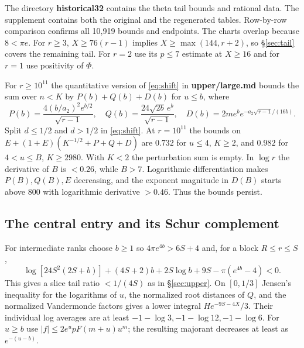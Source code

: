 \documentclass[11pt,a4paper,reqno]{amsart}
\numberwithin{equation}{section}
\begin{document}
The directory \textbf{historical32} contains the theta tail bounds and rational data. The supplement contains both the original and the regenerated tables. Row-by-row comparison confirms all 10,919 bounds and endpoints. The charts overlap because \(8<\pi e\). For \(r\ge3\), \(X\ge76(r-1)\) implies \(X\ge\max(144,r+2)\), so \S\ref{sec:tail} covers the remaining tail. For \(r=2\) use its \(p\le7\) estimate at \(X\ge16\) and for \(r=1\) use positivity of \(\Phi\).

For \(r\ge10^{11}\) the quantitative version of \eqref{eq:shift} in \textbf{upper/large.md} bounds the sum over \(n<K\) by \(P(b)+Q(b)+D(b)\) for \(u\le b\), where \[P(b)=\frac{4(b/a_2)^2e^{b/2}}{\sqrt{r-1}},\quad Q(b)=\frac{24\sqrt{2b}\,e^b}{\sqrt{r-1}},\quad
D(b)=2m e^b e^{-a_2\sqrt{r-1}/(16b)}.\] Split \(d\le1/2\) and \(d>1/2\) in \eqref{eq:shift}. At \(r=10^{11}\) the bounds on \(E+(1+E)(K^{-1/2}+P+Q+D)\) are \(0.732\) for \(u\le4\), \(K\ge2\), and \(0.982\) for \(4<u\le B\), \(K\ge2980\). With \(K<2\) the perturbation sum is empty. In \(\log r\) the derivative of \(B\) is \(<0.26\), while \(B>7\). Logarithmic differentiation makes \(P(B),Q(B),E\) decreasing, and the exponent magnitude in \(D(B)\) starts above 800 with logarithmic derivative \(>0.46\). Thus the bounds persist.

\subsection{The central entry and its Schur complement}\label{sec:schur}


For intermediate ranks choose \(b\ge1\) so \(4\pi e^{4b}>6S+4\) and, for a block \(R\le r\le S\), \[\log[24S^2(2S+b)]+(4S+2)b+2S\log b+9S-\pi(e^{4b}-4)<0.\] This gives a slice tail ratio \(<1/(4S)\) as in \S\ref{sec:upper}. On \([0,1/3]\) Jensen's inequality for the logarithms of \(u\), the normalized root distances of \(Q\), and the normalized Vandermonde factors gives a lower integral \(H e^{-9S-4X}/3\). Their individual log averages are at least \(-1-\log3,-1-\log12,-1-\log6\). For \(u\ge b\) use \(|f|\le2e^upF(m+u)u^m\); the resulting majorant decreases at least as \(e^{-(u-b)}\).
\end{document}
